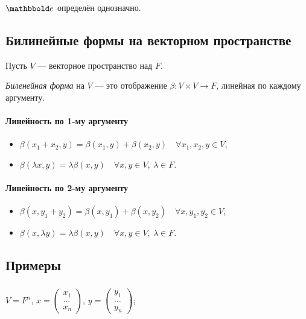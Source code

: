 \begin{exercise}
    $\E$ определён однозначно.
\end{exercise}


\subsection{Билинейные формы на векторном пространстве}

Пусть $V$ --- векторное пространство над $F$.

\begin{definition}
    \textit{Биленейная форма} на $V$ --- это отображение $\beta \colon V \times V \to F$, линейная по каждому аргументу.
\end{definition}

\paragraph{Линейность по 1-му аргументу}
\begin{itemize}[nosep]
\item $\beta(x_1 + x_2, y) = \beta(x_1, y) + \beta(x_2, y) \quad \forall x_1, x_2, y \in V$,
\item $\beta(\lambda x, y) = \lambda\beta(x, y) \quad \forall x, y \in V, \ \lambda \in F$.
\end{itemize}

\paragraph{Линейность по 2-му аргументу}
\begin{itemize}[nosep]
\item $\beta(x, y_1 + y_2) = \beta(x, y_1) + \beta(x, y_2) \quad \forall x, y_1, y_2 \in V$,
\item $\beta(x, \lambda y) = \lambda\beta(x, y) \quad \forall x, y \in V, \ \lambda \in F$.
\end{itemize}


\subsection{Примеры}

\subsubsection{}

$V = F^n$, $x = \begin{pmatrix} x_1 \\ \dots \\ x_n \end{pmatrix}$, $y = \begin{pmatrix} y_1 \\ \dots \\ y_n \end{pmatrix}$;

